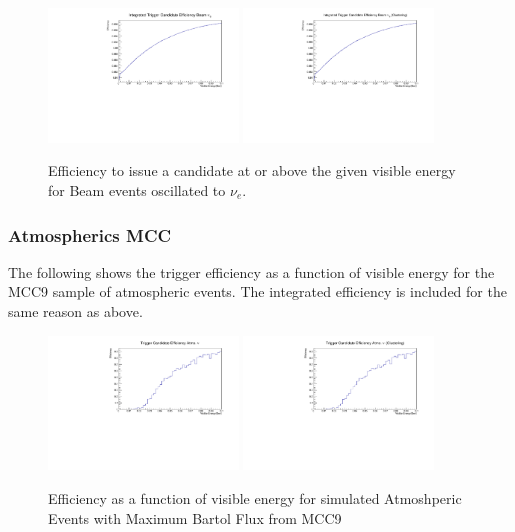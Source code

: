 \documentclass[10pt]{article}
\begin{document}
\begin{figure}[H]
    \centering
    \includegraphics[angle=270,width=0.45\textwidth]{UpdatedEff/Integrated_Nu_e_Efficiency_MCC10.pdf}
    \includegraphics[angle=270,width=0.45\textwidth]{UpdatedEff/Integrated_Nu_e_Efficiency_MCC10_CLUS.pdf}
    \caption{Efficiency to issue a candidate at or above the given visible energy for Beam events oscillated to $\nu_{e}$.}
    \label{fig:eff_beam_nue_int}
\end{figure}

\subsubsection{Atmospherics MCC}

The following shows the trigger efficiency as a function of visible energy for the MCC9 sample of atmospheric events. The integrated efficiency is included for the same reason as above.


\begin{figure}[H]
    \centering
    \includegraphics[angle=270,width=0.45\textwidth]{UpdatedEff/Differential_Atmnu_Max_Efficiency_MCC9.pdf}
    \includegraphics[angle=270,width=0.45\textwidth]{UpdatedEff/Differential_Atmnu_Max_Efficiency_MCC9_CLUS.pdf}
    \caption{Efficiency as a function of visible energy for simulated Atmoshperic Events with Maximum Bartol Flux from MCC9}
    \label{fig:eff_atm}
\end{figure}
\end{document}
